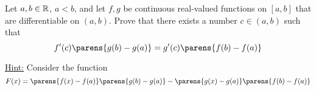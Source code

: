 \begin{problem}
  Let $a, b \in \mathbb{R}$, $a < b$, and let $f, g$ be continuous
  real-valued functions on $[a, b]$ that are differentiable
  on $(a, b)$.
  Prove that there exists a number $c \in (a, b)$ such that
  \[ f'(c) \parens{g(b) - g(a)} = g'(c)\parens{f(b) - f(a)} \]

  \step
  \underline{Hint:} Consider the function
  \[
    F(x) =
      \parens{f(x) - f(a)} \parens{g(b) - g(a)}
      - \parens{g(x) - g(a)} \parens{f(b) - f(a)}  
    \]
\end{problem}
\begin{answer}
  
\end{answer}
